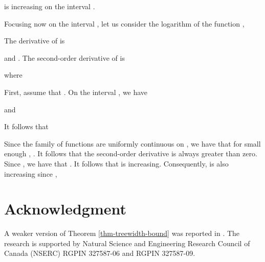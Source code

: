 \documentclass[11pt]{article}
\providecommand{\qed}{\hfill }
\begin{document}
is increasing on the interval   .

Focusing now on the interval , 
let us consider the  logarithm of the function ,

The derivative of  is

and . The second-order derivative of  is

where

First, assume that . On the interval ,
we have


and

It follows that

Since the family of functions  are uniformly
continuous on , we have that for small enough
, . 
It follows that the second-order derivative  is always greater than zero.
Since , we have that . It follows that  is increasing. Consequently,  is also increasing since 
, 
\qed




 
\section*{Acknowledgment}
\noindent
A  weaker version of Theorem \ref{thm-treewidth-bound} was reported  in \cite{yong06treewidth}.
The research is supported by Natural Science and Engineering Research Council of Canada (NSERC) RGPIN 327587-06 and RGPIN 327587-09.



\end{document}
